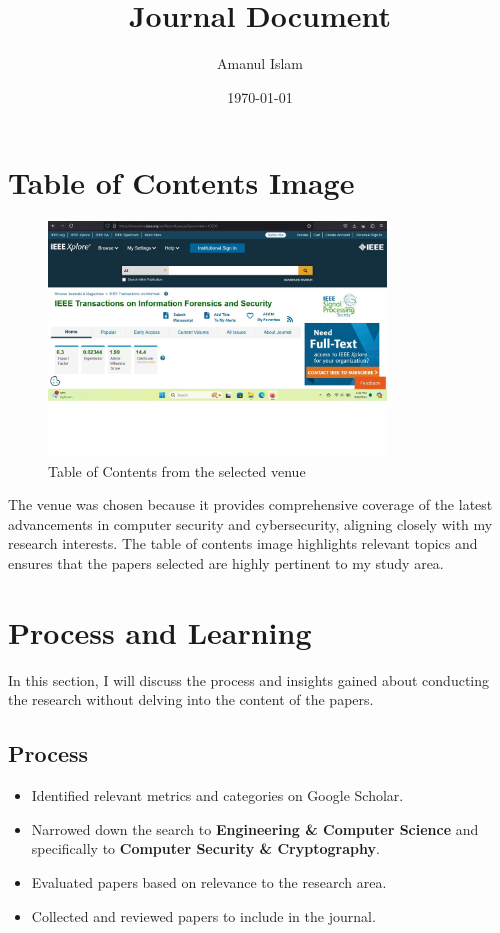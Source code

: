 \documentclass{article}
\title{Journal Document}
\author{Amanul Islam}
\date{\today}
\begin{document}
\maketitle

\section{Table of Contents Image}
\begin{figure}[h]
    \centering
    \includegraphics[width=0.8\textwidth]{content page2.jpg} %
    \caption{Table of Contents from the selected venue}
    \label{fig:toc}
\end{figure}

\noindent The venue was chosen because it provides comprehensive coverage of the latest advancements in computer security and cybersecurity, aligning closely with my research interests. The table of contents image highlights relevant topics and ensures that the papers selected are highly pertinent to my study area.

\section{Process and Learning}
In this section, I will discuss the process and insights gained about conducting the research without delving into the content of the papers. 

\subsection{Process}
\begin{itemize}
    \item Identified relevant metrics and categories on Google Scholar.
    \item Narrowed down the search to \textbf{Engineering \& Computer Science} and specifically to \textbf{Computer Security \& Cryptography}.
    \item Evaluated papers based on relevance to the research area.
    \item Collected and reviewed papers to include in the journal.
\end{itemize}
\end{document}
